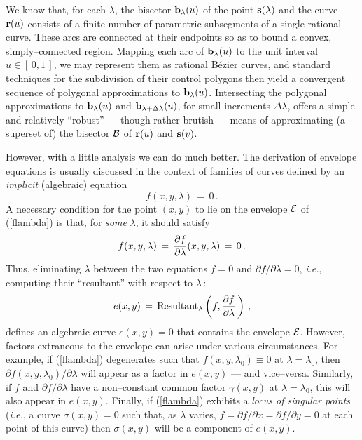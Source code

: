 We know that, for each $\lambda$, the bisector ${\bf b}_\lambda(u)$
of the point ${\bf s}(\lambda)$ and the curve ${\bf r}(u)$ consists
of a finite number of parametric subsegments of a single rational
curve. These arcs are connected at their endpoints so as to bound
a convex, simply--connected region. Mapping each arc of ${\bf b}_
\lambda(u)$ to the unit interval $u\in[\,0,1\,]$, we may represent
them as rational B\'ezier curves, and standard techniques \cite
{farin83} for the subdivision of their control polygons then yield
a convergent sequence of polygonal approximations to ${\bf b}_\lambda
(u)$. Intersecting the polygonal approximations to ${\bf b}_\lambda
(u)$ and ${\bf b}_{\lambda+\Delta\lambda}(u)$, for small increments
$\Delta\lambda$, offers a simple and relatively ``robust'' --- though
rather brutish --- means of approximating (a superset of) the
bisector ${\cal B}$ of ${\bf r}(u)$ and ${\bf s}(v)$.

However, with a little analysis we can do much better. The
derivation of envelope equations is usually discussed \cite
{boltyanskii64,bruce81,fowler29} in the context of families of
curves defined by an {\it implicit\/} (algebraic) equation
\begin{equation} \label{flambda}
f(x,y,\lambda) \,=\, 0 \,.
\end{equation}
A necessary condition for the point $(x,y)$ to lie on the envelope
${\cal E}$ of (\ref{flambda}) is that, for {\it some\/} $\lambda$, it
should satisfy
\begin{equation} \label{fsys}
f(x,y,\lambda) \,=\,
{\partial f \over \partial\lambda}(x,y,\lambda) \,=\, 0 \,.
\end{equation}
Thus, eliminating $\lambda$ between the two equations $f=0$
and $\partial f/\partial\lambda=0$, {\it i.e.}, computing their
``resultant'' \cite{uspensky48} with respect to $\lambda\,$:
\begin{equation} \label{e}
e(x,y) \,=\, {\rm Resultant}_\lambda
\left(f,{\partial f \over \partial\lambda}\,\right) \,,
\end{equation}
defines an algebraic curve $e(x,y)=0$ that contains the envelope
${\cal E}$. However, factors extraneous to the envelope can arise
under various circumstances. For example, if (\ref{flambda})
degenerates such that $f(x,y,\lambda_0) \equiv 0$ at $\lambda
=\lambda_0$, then $\partial f(x,y,\lambda_0)/\partial\lambda$
will appear as a factor in $e(x,y)$ --- and vice--versa. Similarly,
if $f$ and $\partial f/\partial\lambda$ have a non--constant common
factor $\gamma(x,y)$ at $\lambda=\lambda_0$, this will also appear
in $e(x,y)$. Finally, if (\ref{flambda}) exhibits a {\it locus of
singular points\/} ({\it i.e.}, a curve $\sigma(x,y)=0$ such that,
as $\lambda$ varies, $f=\partial f/\partial x=\partial f/\partial
y=0$ at each point of this curve) then $\sigma(x,y)$ will be a
component of $e(x,y)$.

